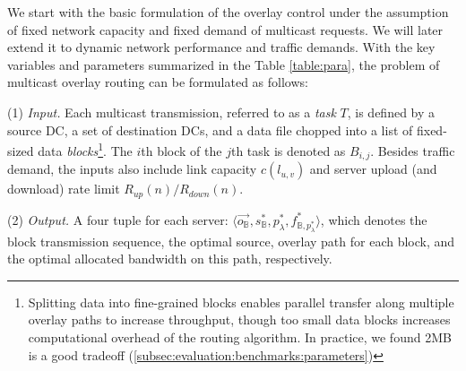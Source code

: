 We start with the basic formulation of the overlay control under the assumption of fixed network capacity and fixed demand of multicast requests. We will later extend it to dynamic network performance and traffic demands. With the key variables and parameters summarized in the Table \ref{table:para}, the problem of multicast overlay routing can be formulated as follows:


\noindent(1) {\em Input.}%
Each multicast transmission, referred to as a {\em task} $T$, is defined
by a source DC, a set of destination DCs, and a data file chopped into
a list of fixed-sized data
{\em blocks}\footnote{Splitting data into fine-grained blocks enables
parallel transfer along
multiple overlay paths to increase throughput, though too small data blocks
increases computational overhead of the routing algorithm.
In practice, we found 2MB is a good tradeoff
(\Section\ref{subsec:evaluation:benchmarks:parameters})}.
The $i$th block of the $j$th task is denoted as $B_{i,j}$.
Besides traffic demand, the inputs also include link capacity $c(l_{u,v})$ and
server upload (and download) rate limit $R_{up}(n)/R_{down}(n)$. %

\noindent(2) {\em Output.} A four tuple for each server: $\langle \overrightarrow{o_\mathbb{B}}, s_{\mathbb{B}}^*, p_{\lambda}^*, f^*_{\mathbb{B},p_{\lambda}^*} \rangle$, which denotes the block transmission sequence, the optimal source, overlay path for each block, and the optimal allocated bandwidth on this path, respectively. %

